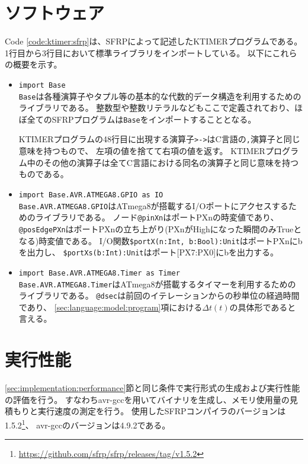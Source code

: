 \clearpage
\section{ソフトウェア}
Code \ref{code:ktimer:sfrp}は、SFRPによって記述したKTIMERプログラムである。
1行目から3行目において標準ライブラリをインポートしている。
以下にこれらの概要を示す。

\begin{itemize}
  \item \texttt{import Base}\\
  \texttt{Base}は各種演算子やタプル等の基本的な代数的データ構造を利用するためのライブラリである。
  整数型や整数リテラルなどもここで定義されており、ほぼ全てのSFRPプログラムは\texttt{Base}をインポートすることとなる。

  KTIMERプログラムの48行目に出現する演算子\texttt{>->}はC言語の\texttt{,}演算子と同じ意味を持つもので、
  左項の値を捨てて右項の値を返す。
  KTIMERプログラム中のその他の演算子は全てC言語における同名の演算子と同じ意味を持つものである。

  \item \texttt{import Base.AVR.ATMEGA8.GPIO as IO}\\
  \texttt{Base.AVR.ATMEGA8.GPIO}はATmega8が搭載するI/Oポートにアクセスするためのライブラリである。
  ノード\texttt{@pinXn}はポートPXnの時変値であり、
  \texttt{@posEdgePXn}はポートPXnの立ち上がり(PXnがHighになった瞬間のみTrueとなる)時変値である。
  I/O関数\texttt{\$portX(n:Int, b:Bool):Unit}はポートPXnにbを出力し、
  \texttt{\$portXs(b:Int):Unit}はポート[PX7:PX0]にbを出力する。

  \item \texttt{import Base.AVR.ATMEGA8.Timer as Timer}\\
  \texttt{Base.AVR.ATMEGA8.Timer}はATmega8が搭載するタイマーを利用するためのライブラリである。
  \texttt{@dsec}は前回のイテレーションからの秒単位の経過時間であり、
  \ref{sec:language:model:program}項における$\Delta t(t)$の具体形であると言える。
\end{itemize}


\clearpage


\section{実行性能}
\ref{sec:implementation:performance}節と同じ条件で実行形式の生成および実行性能の評価を行う。
すなわちavr-gccを用いてバイナリを生成し、メモリ使用量の見積もりと実行速度の測定を行う。
使用したSFRPコンパイラのバージョンは1.5.2\footnote{\url{https://github.com/sfrp/sfrp/releases/tag/v1.5.2}}、
avr-gccのバージョンは4.9.2である。


